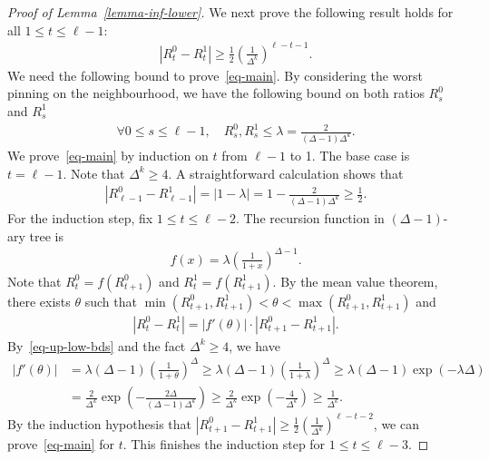 \documentclass{theoretics}
\newcommand{\tp}[1]{{\left( #1 \right)}}
\newcommand{\abs}[1]{\ensuremath{\left\vert#1\right\vert}}
\begin{document}
\begin{proof}[Proof of Lemma~\ref{lemma-inf-lower}]
We next prove the following result holds for all $1 \leq t \leq \ell - 1$:
\begin{align}\label{eq-main}
	\abs{R^0_t  - R^1_t } \geq \frac{1}{2}\tp{\frac{1}{\Delta^k}}^{\ell  -t - 1}.
\end{align}
We need the following bound to prove~\eqref{eq-main}.
By considering the worst pinning on the neighbourhood, 
we have the following bound on both ratios $R^0_s$ and $R^1_s$
\begin{align}\label{eq-up-low-bds}
\forall 0\leq s \leq \ell - 1, \quad  R^0_s,R^1_s \leq \lambda = \frac{2}{(\Delta - 1)\Delta^{k}}.
\end{align}
We prove~\eqref{eq-main} by induction on $t$ from $\ell - 1$ to 1.
The base case is $t = \ell - 1$. 
Note that $\Delta^k \geq 4$.
A straightforward calculation shows that
\begin{align*}
	\abs{R^0_{\ell - 1} - R^1_{\ell - 1}} = \abs{ 1 - \lambda} = 1 - \frac{2}{(\Delta - 1)\Delta^{k}} \geq \frac{1}{2}.
\end{align*}
For the induction step, fix $1 \leq t \leq \ell - 2$. %
The recursion function in $(\Delta-1)$-ary tree is
\begin{align*}
	f(x) = \lambda \tp{\frac{1}{1+x}}^{\Delta - 1}.
\end{align*}
Note that $R^0_t = f(R^0_{t+1})$ and $R^1_t = f(R^1_{t+1})$. By the mean value theorem, there exists  $\theta$ such that $\min(R^0_{t+1}, R^1_{t+1}) < \theta < \max(R^0_{t+1}, R^1_{t+1}) $ and 
\begin{align*}
	\abs{R^0_t  - R^1_t } = |f'(\theta)| \cdot  \abs{R^0_{t+1} - R^1_{t+1}}. 
\end{align*}
By~\eqref{eq-up-low-bds} and the fact $\Delta^k \geq 4$, we have
\begin{align*}
	\abs{f'(\theta)} &= \lambda(\Delta - 1) \tp{\frac{1}{1+\theta}}^{\Delta} \geq \lambda(\Delta - 1)\tp{\frac{1}{1+\lambda}}^{\Delta} \geq \lambda(\Delta - 1)\exp(-\lambda\Delta)\\
	&= \frac{2}{\Delta^k} \exp \tp{ - \frac{2\Delta}{(\Delta - 1)\Delta^k} } \geq \frac{2}{\Delta^k} \exp \tp{ - \frac{4}{\Delta^k} } \geq \frac{1}{\Delta^k}.
\end{align*}
By the induction hypothesis that $\abs{R^0_{t+1} - R^1_{t+1}} \geq \frac{1}{2} (\frac{1}{\Delta^k})^{\ell - t - 2} $, we can prove~\eqref{eq-main} for $t$. This finishes the induction step for $1 \leq t \leq \ell - 3$.


\end{proof}
\end{document}
